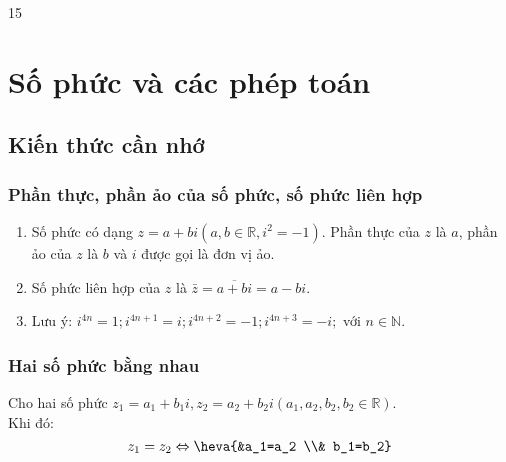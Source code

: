 \setcounter {section} {15}
\setcounter{ex}{0}
\section{Số phức và các phép toán}
\subsection{Kiến thức cần nhớ}
\begin{khung}
	\subsubsection{Phần thực, phần ảo của số phức, số phức liên hợp}	
	\begin{enumerate}[\textbullet]
		\item Số phức có dạng $z=a+b i\left(a, b \in \mathbb{R}, i^2=-1\right)$. Phần thực của $z$ là $a$, phần ảo của $z$ là $b$ và $i$ được gọi là đơn vị ảo.
		\item Số phức liên hợp của $z$ là $\bar{z}=\overline{a+b i}=a-b i$.
		
		\item Lưu ý: $i^{4n}=1; i^{4 n+1}=i; i^{4n+2}=-1; i^{4n+3}=-i;$ với $n \in \mathbb{N}$.
	\end{enumerate}
	\subsubsection{Hai số phức bằng nhau}
	Cho hai số phức $z_1=a_1+b_1 i, z_2=a_2+b_2 i\left(a_1, a_2, b_2, b_2 \in \mathbb{R}\right)$. \\
	Khi đó: $$z_1=z_2 \Leftrightarrow\heva{&a_1=a_2 \\& b_1=b_2}$$

\end{khung}
